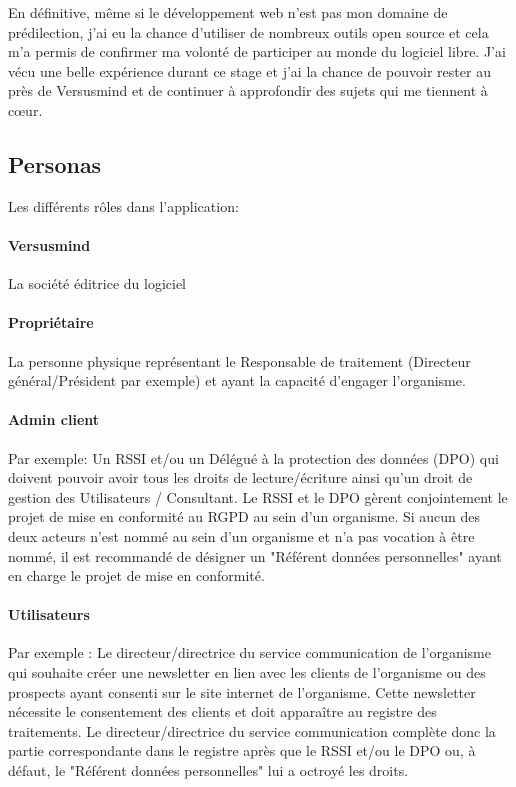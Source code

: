\documentclass[12pt, a4paper]{report}
\begin{document}
En définitive, même si le développement web n'est pas mon domaine de prédilection, j'ai eu la chance d'utiliser de nombreux outils open source et cela m'a permis de confirmer ma volonté de participer au monde du logiciel libre.
J'ai vécu une belle expérience durant ce stage et j'ai la chance de pouvoir rester au près de Versusmind et de continuer à approfondir des sujets qui me tiennent à cœur.

\begin{appendix}
\chapter{Personas}
Les différents rôles dans l'application:

\subsubsection{Versusmind}
La société éditrice du logiciel

\subsubsection{Propriétaire}

La personne physique représentant le Responsable de traitement (Directeur général/Président par exemple) et ayant la capacité d'engager l'organisme.

\subsubsection{Admin client}
Par exemple: Un RSSI et/ou un Délégué à la protection des données (DPO) qui doivent pouvoir avoir tous les droits de lecture/écriture ainsi qu'un droit de gestion des Utilisateurs / Consultant.\newline
Le RSSI et le DPO gèrent conjointement le projet de mise en conformité au RGPD au sein d'un organisme.\newline
Si aucun des deux acteurs n'est nommé au sein d'un organisme et n'a pas vocation à être nommé, il est recommandé de désigner un "Référent données personnelles" ayant en charge le projet de mise en conformité.\newpage

\subsubsection{Utilisateurs}
Par exemple : Le directeur/directrice du service communication de l'organisme qui souhaite créer une newsletter en lien avec les clients de l'organisme ou des prospects ayant consenti sur le site internet de l'organisme.\newline
Cette newsletter nécessite le consentement des clients et doit apparaître au registre des traitements.\newline
Le directeur/directrice du service communication complète donc la partie correspondante dans le registre après que le RSSI et/ou le DPO ou, à défaut, le "Référent données personnelles" lui a octroyé les droits.


\end{appendix}
\end{document}
